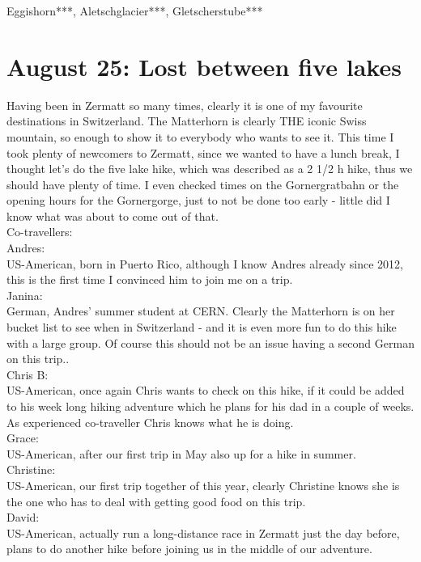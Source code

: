 Eggishorn***, Aletschglacier***, Gletscherstube*** 

\section{August 25: Lost between five lakes}
\label{2019:Zermatt}

Having been in Zermatt so many times, clearly it is one of my favourite destinations in Switzerland. The Matterhorn is clearly THE iconic Swiss mountain, so enough to show it to everybody who wants to see it. This time I took plenty of newcomers to Zermatt, since we wanted to have a lunch break, I thought let's do the five lake hike, which was described as a 2 1/2 h hike, thus we should have plenty of time. I even checked times on the Gornergratbahn or the opening hours for the Gornergorge, just to not be done too early - little did I know what was about to come out of that.\\

Co-travellers:\\
Andres:\\
US-American, born in Puerto Rico, although I know Andres already since 2012, this is the first time I convinced him to join me on a trip.\\

Janina:\\
German, Andres' summer student at CERN. Clearly the Matterhorn is on her bucket list to see when in Switzerland - and it is even more fun to do this hike with a large group. Of course this should not be an issue having a second German on this trip..\\

Chris B:\\
US-American, once again Chris wants to check on this hike, if it could be added to his week long hiking adventure which he plans for his dad in a couple of weeks. As experienced co-traveller Chris knows what he is doing.\\

Grace:\\
US-American, after our first trip in May also up for a hike in summer.\\

Christine:\\
US-American, our first trip together of this year, clearly Christine knows she is the one who has to deal with getting good food on this trip.\\

David:\\
US-American, actually run a long-distance race in Zermatt just the day before, plans to do another hike before joining us in the middle of our adventure.\\

